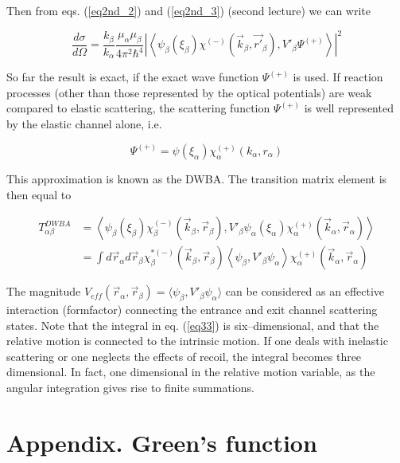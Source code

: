 \documentclass[a4paper,14pt]{book}
\begin{document}
Then from eqs. (\ref{eq2nd_2}) and (\ref{eq2nd_3}) (second lecture) we can write


\begin{equation}\label{eq31}
\frac{d\sigma}{d\Omega}= \frac{k_\beta}{k_\alpha} \frac{\mu_\alpha \mu_\beta}{4 \pi^2 \hbar^4} \left|
\left\langle
\psi_\beta (\xi_\beta)\chi^{(-)}(\vec k_\beta, \vec {r'}_\beta),V'_\beta \Psi^{(+)}\right\rangle \right|^2
\end{equation}



So far the result is exact, if the exact wave function $\Psi^{(+)}$ is used. If reaction processes (other than those represented by the optical potentials) are weak compared to elastic scattering, the scattering function $\Psi^{(+)}$ is well represented by the elastic channel alone, i.e.

 \begin{equation}\label{eq32}
\Psi^{(+)}=\psi(\xi_\alpha) \chi_\alpha^{(+)} (k_\alpha, r_\alpha)
\end{equation}

This approximation is known as the DWBA. The transition matrix element is then equal to

\begin{equation}\label{eq33}
\begin{split}
T_{\alpha \beta}^{DWBA}&=\left\langle
\psi_\beta (\xi_\beta)\chi_\beta^{(-)}(\vec k_\beta, \vec r_\beta),V'_\beta \psi_\alpha(\xi_\alpha) \chi_\alpha^{(+)} (\vec k_\alpha,\vec r_\alpha)\right\rangle \\
& =\int d \vec r_\alpha d \vec r_\beta  \chi_\beta^{*(-)}(\vec k_\beta, \vec r_\beta)
\left\langle \psi_\beta ,V'_\beta \psi_\alpha \right\rangle \chi_\alpha^{(+)} (\vec k_\alpha,\vec r_\alpha)
\end{split}
\end{equation}

The magnitude $V_{eff}(\vec r_\alpha, \vec r_\beta)=\langle \psi_\beta,V'_\beta \psi_\alpha \rangle$ can be considered as an effective interaction (formfactor) connecting the entrance and exit channel scattering states.
Note that the integral in eq. (\ref{eq33}) is six--dimensional, and that the relative motion is connected to the intrinsic motion. If one deals with inelastic scattering or one neglects the effects of recoil, the integral becomes three dimensional. In fact, one dimensional in the relative motion variable, as the angular integration gives rise to finite summations.
\section{Appendix. Green's function}
\end{document}
